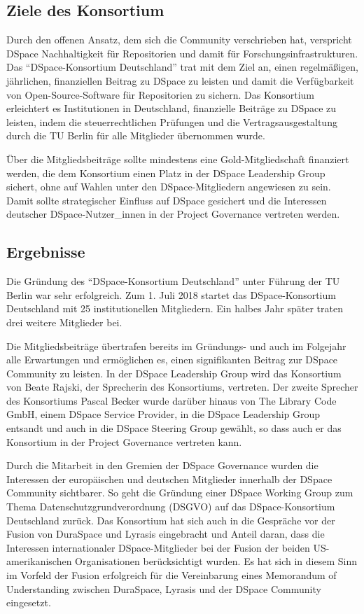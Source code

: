 \documentclass[a4paper,
fontsize=11pt,
oneside,
numbers=noperiodatend,
parskip=half-,
bibliography=totoc,
final
]{scrartcl}
\begin{document}
\hypertarget{ziele-des-konsortium}{%
\subsection{Ziele des Konsortium}\label{ziele-des-konsortium}}

Durch den offenen Ansatz, dem sich die Community verschrieben hat,
verspricht DSpace Nachhaltigkeit für Repositorien und damit für
Forschungsinfrastrukturen. Das \enquote{DSpace-Konsortium Deutschland}
trat mit dem Ziel an, einen regelmäßigen, jährlichen, finanziellen
Beitrag zu DSpace zu leisten und damit die Verfügbarkeit von
Open-Source-Software für Repositorien zu sichern. Das Konsortium
erleichtert es Institutionen in Deutschland, finanzielle Beiträge zu
DSpace zu leisten, indem die steuerrechtlichen Prüfungen und die
Vertragsausgestaltung durch die TU Berlin für alle Mitglieder übernommen
wurde.

Über die Mitgliedsbeiträge sollte mindestens eine Gold-Mitgliedschaft
finanziert werden, die dem Konsortium einen Platz in der DSpace
Leadership Group sichert, ohne auf Wahlen unter den DSpace-Mitgliedern
angewiesen zu sein. Damit sollte strategischer Einfluss auf DSpace
gesichert und die Interessen deutscher DSpace-Nutzer\_innen in der
Project Governance vertreten werden.

\hypertarget{ergebnisse}{%
\subsection{Ergebnisse}\label{ergebnisse}}

Die Gründung des \enquote{DSpace-Konsortium Deutschland} unter Führung
der TU Berlin war sehr erfolgreich. Zum 1. Juli 2018 startet das
DSpace-Konsortium Deutschland mit 25 institutionellen Mitgliedern. Ein
halbes Jahr später traten drei weitere Mitglieder bei.

Die Mitgliedsbeiträge übertrafen bereits im Gründungs- und auch im
Folgejahr alle Erwartungen und ermöglichen es, einen signifikanten
Beitrag zur DSpace Community zu leisten. In der DSpace Leadership Group
wird das Konsortium von Beate Rajski, der Sprecherin des Konsortiums,
vertreten. Der zweite Sprecher des Konsortiums Pascal Becker wurde
darüber hinaus von The Library Code GmbH, einem DSpace Service Provider,
in die DSpace Leadership Group entsandt und auch in die DSpace Steering
Group gewählt, so dass auch er das Konsortium in der Project Governance
vertreten kann.

Durch die Mitarbeit in den Gremien der DSpace Governance wurden die
Interessen der europäischen und deutschen Mitglieder innerhalb der
DSpace Community sichtbarer. So geht die Gründung einer DSpace Working
Group zum Thema Datenschutzgrundverordnung (DSGVO) auf das
DSpace-Konsortium Deutschland zurück. Das Konsortium hat sich auch in
die Gespräche vor der Fusion von DuraSpace und Lyrasis eingebracht und
Anteil daran, dass die Interessen internationaler DSpace-Mitglieder bei
der Fusion der beiden US-amerikanischen Organisationen berücksichtigt
wurden. Es hat sich in diesem Sinn im Vorfeld der Fusion erfolgreich für
die Vereinbarung eines Memorandum of Understanding zwischen DuraSpace,
Lyrasis und der DSpace Community eingesetzt.
\end{document}
